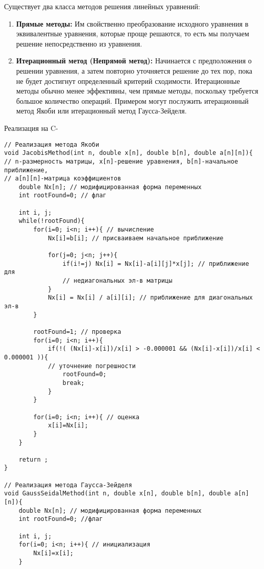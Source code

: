 \vspace{\baselineskip}
Существует два класса методов решения линейных уравнений:

\vspace{\baselineskip}
\begin{enumerate}
    \item \textbf{Прямые методы:} Им свойственно преобразование исходного уравнения в эквивалентные уравнения, которые проще решаются, то есть мы получаем решение непосредственно из уравнения. 
    \item \textbf{Итерационный метод (Непрямой метод):} Начинается с предположения о решении уравнения, а затем повторно уточняется решение до тех пор, пока не будет достигнут определенный критерий сходимости. Итерационные методы обычно менее эффективны, чем прямые методы, поскольку требуется большое количество операций. Примером могут послужить итерационный метод Якоби или итерационный метод Гаусса-Зейделя.
\end{enumerate}

\vspace{\baselineskip}
Реализация на C-

\vspace{\baselineskip}
\begin{tcolorbox}
\begin{verbatim}
// Реализация метода Якоби 
void JacobisMethod(int n, double x[n], double b[n], double a[n][n]){ 
// n-размерность матрицы, x[n]-решение уравнения, b[n]-начальное приближение, 
// a[n][n]-матрица коэффициентов   
	double Nx[n]; // модифицированная форма переменных   
	int rootFound=0; // флаг

	int i, j;    
	while(!rootFound){        
		for(i=0; i<n; i++){ // вычисление            
			Nx[i]=b[i]; // присваиваем начальное приближение

			for(j=0; j<n; j++){                
				if(i!=j) Nx[i] = Nx[i]-a[i][j]*x[j]; // приближение для 
				// недиагональных эл-в матрицы         
			}            
			Nx[i] = Nx[i] / a[i][i]; // приближение для диагональных эл-в      
		}
        
		rootFound=1; // проверка        
		for(i=0; i<n; i++){            
			if(!( (Nx[i]-x[i])/x[i] > -0.000001 && (Nx[i]-x[i])/x[i] < 0.000001 )){ 
			// уточнение погрешности              
				rootFound=0;                
				break;            
			}        
		}
        
		for(i=0; i<n; i++){ // оценка            
			x[i]=Nx[i];        
		}    
	}
    
	return ; 
}

// Реализация метода Гаусса-Зейделя 
void GaussSeidalMethod(int n, double x[n], double b[n], double a[n][n]){    
	double Nx[n]; // модифицированная форма переменных    
	int rootFound=0; //флаг
    
	int i, j;    
	for(i=0; i<n; i++){ // инициализация        
		Nx[i]=x[i];  
	}
\end{verbatim}
\end{tcolorbox}
